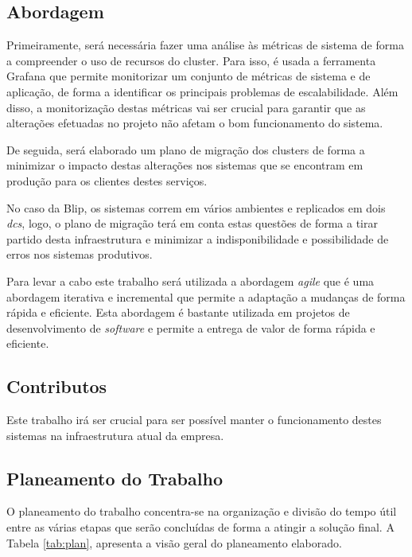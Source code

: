 \subsection{Abordagem}

Primeiramente, será necessária fazer uma análise às métricas de sistema de forma a compreender
o uso de recursos do \gls{cluster}. Para isso, é usada a ferramenta Grafana que permite
monitorizar um conjunto de métricas de sistema e de aplicação, de forma a identificar os principais
problemas de escalabilidade. Além disso, a monitorização destas métricas vai ser crucial para
garantir que as alterações efetuadas no projeto não afetam o bom funcionamento do sistema.

De seguida, será elaborado um plano de migração dos \glspl{cluster} de forma a minimizar o 
impacto destas alterações nos sistemas que se encontram em produção para os clientes destes serviços.

No caso da Blip, os sistemas correm em vários ambientes e replicados em dois \textit{\glspl{dc}},
logo, o plano de migração terá em conta estas questões de forma a tirar partido desta infraestrutura
e minimizar a indisponibilidade e possibilidade de erros nos sistemas produtivos.

Para levar a cabo este trabalho será utilizada a abordagem \textit{agile} que é uma abordagem
iterativa e incremental que permite a adaptação a mudanças de forma rápida e eficiente. Esta abordagem
é bastante utilizada em projetos de desenvolvimento de \textit{software} e permite a entrega de valor
de forma rápida e eficiente.

\subsection{Contributos}

Este trabalho irá ser crucial para ser possível manter o funcionamento destes sistemas na
infraestrutura atual da empresa.


\subsection{Planeamento do Trabalho}

O planeamento do trabalho concentra-se na organização e divisão do tempo útil entre as várias etapas
que serão concluídas de forma a atingir a solução final. A Tabela \ref{tab:plan}, apresenta a visão
geral do planeamento elaborado.

